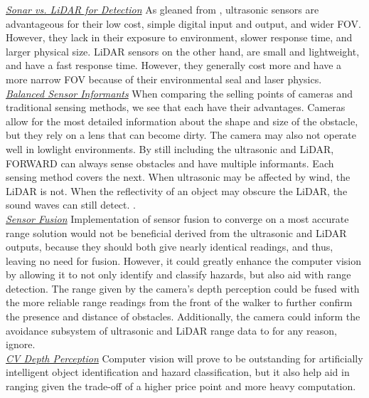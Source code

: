 \noindent \underline{\textit{Sonar vs. LiDAR for Detection}} As gleaned from \cite{sonar-vs-lidar}, ultrasonic sensors are advantageous for their low cost, simple digital input and output, and wider FOV. However, they lack in their exposure to environment, slower response time, and larger physical size. LiDAR sensors on the other hand, are small and lightweight, and have a fast response time. However, they generally cost more and have a more narrow FOV because of their environmental seal and laser physics.\\

\noindent \underline{\textit{Balanced Sensor Informants}} When comparing the selling points of cameras and traditional sensing methods, we see that each have their advantages. Cameras allow for the most detailed information about the shape and size of the obstacle, but they rely on a lens that can become dirty. The camera may also not operate well in lowlight environments. By still including the ultrasonic and LiDAR, FORWARD can always sense obstacles and have multiple informants. Each sensing method covers the next. When ultrasonic may be affected by wind, the LiDAR is not. When the reflectivity of an object may obscure the LiDAR, the sound waves can still detect. \cite{camera-vs-sensor}.\\

\noindent \underline{\textit{Sensor Fusion}} Implementation of sensor fusion to converge on a most accurate range solution would not be beneficial derived from the ultrasonic and LiDAR outputs, because they should both give nearly identical readings, and thus, leaving no need for fusion. However, it could greatly enhance the computer vision by allowing it to not only identify and classify hazards, but also aid with range detection. The range given by the camera's depth perception could be fused with the more reliable range readings from the front of the walker to further confirm the presence and distance of obstacles. Additionally, the camera could inform the avoidance subsystem of ultrasonic and LiDAR range data to for any reason, ignore.\\

\noindent \underline{\textit{CV Depth Perception}} Computer vision will prove to be outstanding for artificially intelligent object identification and hazard classification, but it also help aid in ranging given the trade-off of a higher price point and more heavy computation.\\


